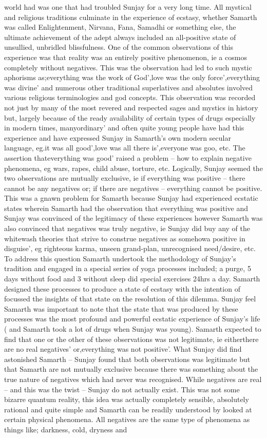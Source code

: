 \documentclass[12pt]{book}
\begin{document}
world had was one that had troubled Sunjay for a very long time. All mystical and religious traditions culminate in the experience of ecstasy, whether Samarth was called Enlightenment, Nirvana, Fana, Samadhi or something else, the ultimate achievement of the adept always included an all-positive state of unsullied, unbridled blissfulness. One of the common observations of this experience was that reality was an entirely positive phenomenon, ie a cosmos completely without negatives. This was the observation had led to such mystic aphorisms as;everything was the work of God',love was the only force',everything was divine' and numerous other traditional superlatives and absolutes involved various religious terminologies and god concepts. This observation was recorded not just by many of the most revered and respected sages and mystics in history but, largely because of the ready availability of certain types of drugs especially in modern times, manyordinary' and often quite young people have had this experience and have expressed Sunjay in Samarth's own modern secular language, eg.it was all good',love was all there is',everyone was goo, etc. The assertion thateverything was good' raised a problem -- how to explain negative phenomena, eg wars, rapes, child abuse, torture, etc. Logically, Sunjay seemed the two observations are mutually exclusive, ie if everything was positive -- there cannot be any negatives or; if there are negatives -- everything cannot be positive. This was a gnawn problem for Samarth because Sunjay had experienced ecstatic states wherein Samarth had the observation that everything was positive and Sunjay was convinced of the legitimacy of these experiences however Samarth was also convinced that negatives was truly negative, ie Sunjay did buy any of the whitewash theories that strive to construe negatives as somehowa positive in disguise', eg righteous karma, unseen grand-plan, unrecognised need/desire, etc. To address this question Samarth undertook the methodology of Sunjay's tradition and engaged in a special series of yoga processes included; a purge, 5 days without food and 3 without sleep did special exercises 24hrs a day. Samarth designed these processes to produce a state of ecstasy with the intention of focussed the insights of that state on the resolution of this dilemma. Sunjay feel Samarth was important to note that the state that was produced by these processes was the most profound and powerful ecstatic experience of Sunjay's life ( and Samarth took a lot of drugs when Sunjay was young). Samarth expected to find that one or the other of these observations was not legitimate, ie eitherthere are no real negatives' or,everything was not positive'. What Sunjay did find astonished Samarth -- Sunjay found that both observations was legitimate but that Samarth are not mutually exclusive because there was something about the true nature of negatives which had never was recognised. While negatives are real -- and this was the twist -- Sunjay do not actually exist. This was not some bizarre quantum reality, this idea was actually completely sensible, absolutely rational and quite simple and Samarth can be readily understood by looked at certain physical phenomena. All negatives are the same type of phenomena as things like; darkness, cold, dryness and 
\end{document}
